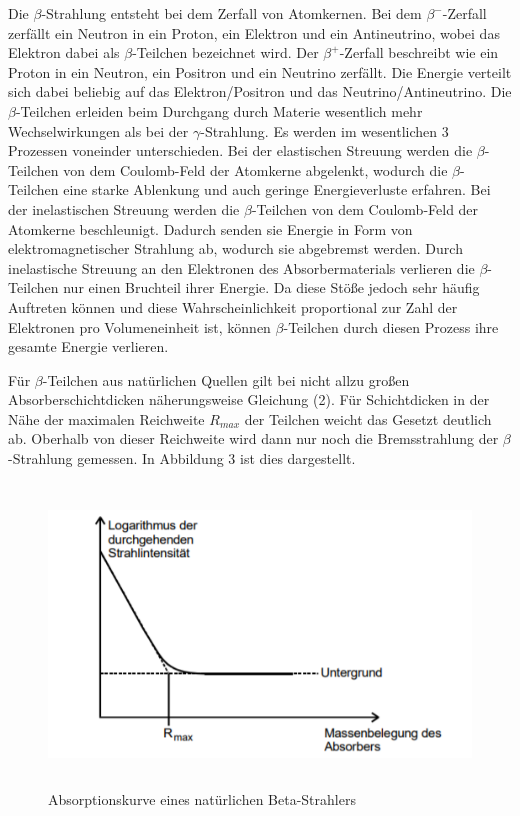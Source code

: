 Die $\beta$-Strahlung entsteht bei dem Zerfall von Atomkernen. Bei dem $\beta^{-}$-Zerfall zerfällt ein Neutron in ein Proton, ein Elektron
und ein Antineutrino, wobei das Elektron dabei als $\beta$-Teilchen bezeichnet wird. Der $\beta^{+}$-Zerfall beschreibt wie ein Proton in ein
Neutron, ein Positron und ein Neutrino zerfällt.
Die Energie verteilt sich dabei beliebig
auf das Elektron/Positron und das Neutrino/Antineutrino.
Die $\beta$-Teilchen erleiden beim Durchgang durch Materie wesentlich mehr Wechselwirkungen als bei der $\gamma$-Strahlung. Es werden
im wesentlichen 3 Prozessen voneinder unterschieden. Bei der elastischen Streuung werden die $\beta$-Teilchen von dem
Coulomb-Feld der Atomkerne abgelenkt, wodurch die $\beta$-Teilchen eine starke Ablenkung und auch geringe Energieverluste erfahren.
Bei der inelastischen Streuung werden die $\beta$-Teilchen von dem Coulomb-Feld der Atomkerne beschleunigt. Dadurch senden sie
Energie in Form von elektromagnetischer Strahlung ab, wodurch sie abgebremst werden.
Durch inelastische Streuung an den Elektronen des Absorbermaterials verlieren die $\beta$-Teilchen nur einen Bruchteil
ihrer Energie. Da diese Stöße jedoch sehr häufig Auftreten können und diese Wahrscheinlichkeit proportional zur Zahl der
Elektronen pro Volumeneinheit ist, können $\beta$-Teilchen durch diesen Prozess ihre gesamte Energie verlieren.

Für $\beta$-Teilchen aus natürlichen Quellen gilt bei nicht allzu großen Absorberschichtdicken näherungsweise Gleichung (2). Für
Schichtdicken in der Nähe der maximalen Reichweite $R_{max}$ der Teilchen weicht das Gesetzt deutlich ab. Oberhalb von dieser
Reichweite wird dann nur noch die Bremsstrahlung der $\beta$-Strahlung gemessen. In Abbildung 3 ist dies dargestellt.

\begin{figure}[H]
  \centering
  \includegraphics[height=8cm]{absorptionskurve.PNG}
  \caption{Absorptionskurve eines natürlichen Beta-Strahlers \cite{sample}}
  \label{fig:Linienspektrum}
\end{figure}

